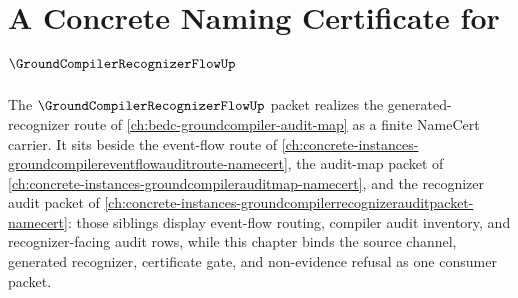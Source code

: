 \chapter{A Concrete Naming Certificate for $\GroundCompilerRecognizerFlowUp$}
\label{ch:concrete-instances-groundcompilerrecognizerflow-namecert}

The $\GroundCompilerRecognizerFlowUp$ packet realizes the generated-recognizer route of \autoref{ch:bedc-groundcompiler-audit-map} as a finite NameCert carrier. It sits beside the event-flow route of \autoref{ch:concrete-instances-groundcompilereventflowauditroute-namecert}, the audit-map packet of \autoref{ch:concrete-instances-groundcompilerauditmap-namecert}, and the recognizer audit packet of \autoref{ch:concrete-instances-groundcompilerrecognizerauditpacket-namecert}: those siblings display event-flow routing, compiler audit inventory, and recognizer-facing audit rows, while this chapter binds the source channel, generated recognizer, certificate gate, and non-evidence refusal as one consumer packet.


